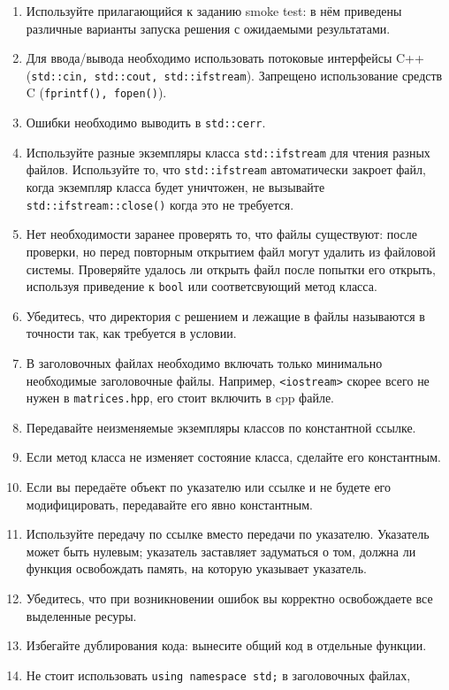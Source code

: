 \documentclass[a4paper,10pt]{article}
\begin{document}
\begin{enumerate}
    \item Используйте прилагающийся к заданию smoke test:
    в нём приведены различные варианты запуска решения с ожидаемыми результатами.
    \item Для ввода/вывода необходимо использовать потоковые интерфейсы C++ ({\tt std::cin, std::cout, std::ifstream}).
    Запрещено использование средств C ({\tt fprintf(), fopen()}).
    \item Ошибки необходимо выводить в {\tt std::cerr}.
    \item Используйте разные экземпляры класса {\tt std::ifstream} для чтения разных файлов.
    Используйте то, что {\tt std::ifstream} автоматически закроет файл,
    когда экземпляр класса будет уничтожен, не вызывайте {\tt std::ifstream::close()} когда это не требуется.
    \item Нет необходимости заранее проверять то, что файлы существуют:
    после проверки, но перед повторным открытием файл могут удалить из файловой системы.
    Проверяйте удалось ли открыть файл после попытки его открыть, используя приведение к {\tt bool} или соответсвующий метод класса.
    \item Убедитесь, что директория с решением и лежащие в файлы называются в точности так, как требуется в условии.
    \item В заголовочных файлах необходимо включать только минимально необходимые заголовочные файлы.
    Например, {\tt <iostream>} скорее всего не нужен в {\tt matrices.hpp}, его стоит включить в cpp файле.
    \item Передавайте неизменяемые экземпляры классов по константной ссылке.
    \item Если метод класса не изменяет состояние класса, сделайте его константным.
    \item Если вы передаёте объект по указателю или ссылке и не будете его модифицировать,
    передавайте его явно константным.
    \item Используйте передачу по ссылке вместо передачи по указателю.
    Указатель может быть нулевым; указатель заставляет задуматься о том,
    должна ли функция освобождать память, на которую указывает указатель.
    \item Убедитесь, что при возникновении ошибок вы корректно освобождаете все выделенные ресуры.
    \item Избегайте дублирования кода: вынесите общий код в отдельные функции.
    \item Не стоит использовать {\tt using namespace std;} в заголовочных файлах,

\end{enumerate}
\end{document}
